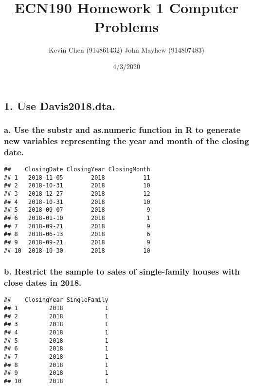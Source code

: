 \documentclass[
]{article}
\title{ECN190 Homework 1 Computer Problems}
\author{Kevin Chen (914861432) John Mayhew (914807483)}
\date{4/3/2020}
\begin{document}
\maketitle

\hypertarget{use-davis2018.dta.}{%
\subsection{1. Use Davis2018.dta.}\label{use-davis2018.dta.}}

\hypertarget{a.-use-the-substr-and-as.numeric-function-in-r-to-generate-new-variables-representing-the-year-and-month-of-the-closing-date.}{%
\subsubsection{a. Use the substr and as.numeric function in R to
generate new variables representing the year and month of the closing
date.}\label{a.-use-the-substr-and-as.numeric-function-in-r-to-generate-new-variables-representing-the-year-and-month-of-the-closing-date.}}

\begin{verbatim}
##    ClosingDate ClosingYear ClosingMonth
## 1   2018-11-05        2018           11
## 2   2018-10-31        2018           10
## 3   2018-12-27        2018           12
## 4   2018-10-31        2018           10
## 5   2018-09-07        2018            9
## 6   2018-01-10        2018            1
## 7   2018-09-21        2018            9
## 8   2018-06-13        2018            6
## 9   2018-09-21        2018            9
## 10  2018-10-30        2018           10
\end{verbatim}

\hypertarget{b.-restrict-the-sample-to-sales-of-single-family-houses-with-close-dates-in-2018.}{%
\subsubsection{b. Restrict the sample to sales of single-family houses
with close dates in
2018.}\label{b.-restrict-the-sample-to-sales-of-single-family-houses-with-close-dates-in-2018.}}

\begin{verbatim}
##    ClosingYear SingleFamily
## 1         2018            1
## 2         2018            1
## 3         2018            1
## 4         2018            1
## 5         2018            1
## 6         2018            1
## 7         2018            1
## 8         2018            1
## 9         2018            1
## 10        2018            1
\end{verbatim}
\end{document}
